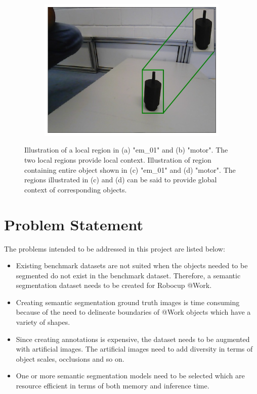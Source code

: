 \begin{figure}
\begin{subfigure}{.4\textwidth}
			\caption{}
			\label{Fig:em01g}
		\end{subfigure}
		\begin{subfigure}{.4\textwidth}
			\centering
			\includegraphics[width=.9\linewidth]{images/motor_context_g}
			\caption{}
			\label{Fig:motorg}
		\end{subfigure}
		\caption{Illustration of a local region in (a) "em\_01" and (b) "motor". The two local regions provide local context. Illustration of region containing entire object shown in (c) "em\_01" and (d) "motor". The regions illustrated in (c) and (d) can be said to provide global context of corresponding objects.}
		\label{Fig:context}
	\end{figure}

\section{Problem Statement}

The problems intended to be addressed in this project are listed below:

	\begin{itemize}
		\item Existing benchmark datasets are not suited when the objects needed to be segmented do not exist in the benchmark dataset. Therefore, a semantic segmentation dataset needs to be created for Robocup @Work.
		\item Creating semantic segmentation ground truth images is time consuming because of the need to delineate boundaries of @Work objects which have a variety of shapes.
		\item Since creating annotations is expensive, the dataset needs to be augmented with artificial images. The artificial images need to add diversity in terms of object scales, occlusions and so on.
		\item One or more semantic segmentation models need to be selected which are resource efficient in terms of both memory and inference time. 
	\end{itemize}